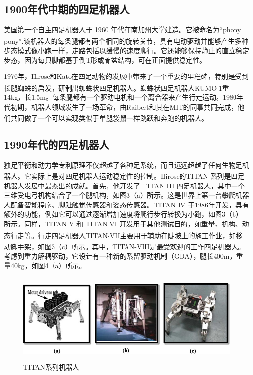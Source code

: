 \documentclass[12pt,a4paper]{ctexart}
\newcommand{\supercite}[1]{\textsuperscript{\cite{#1}}}
\begin{document}
\subsection{1900年代中期的四足机器人}
美国第一个自主四足机器人于 1960 年代在南加州大学建造。它被命名为“phony pony”\supercite{7}.该机器人的每条腿都有两个相同的旋转关节，具有电动驱动并能够产生多种步态模式像小跑一样，走路包括以缓慢的速度爬行。它还能够保持静止的直立稳定步态，因为每只脚都基于倒T形或骨盆结构，可在正面提供稳定性。

1976年，Hirose和Kato在四足动物的发展中带来了一个重要的里程碑，特别是受到长腿蜘蛛的启发，研制出蜘蛛状四足机器人\supercite{8}。蜘蛛状四足机器人KUMO-1重14kg，长1.5m。每条腿都有一个驱动电机和一个离合器来产生行走运动。1980年代初期，机器人领域发生了一场革命，由Raibert和其在MIT的同事共同完成，他们共同做了一个可以实现类似于单腿袋鼠一样跳跃和奔跑的机器人\supercite{9}。
\subsection{1990年代的四足机器人}
独足平衡和动力学专利原理不仅超越了各种足系统，而且远远超越了任何生物足机器人。它实际上是对四足机器人运动稳定性的控制。Hirose的TITAN 系列\supercite{10}是四足机器人发展中最杰出的成就。首先，他开发了 TITAN-III 四足机器人，其中一个三维受电弓机构结合了一个腿机构，如图3（a）所示。这是世界上第一台攀爬机器人配备智能程序、脚趾触觉传感器和姿态传感器。TITAN-IV 于1986年开发，具有额外的功能，例如它可以通过逐渐增加速度将爬行步行转换为小跑，如图3（b）所示。同样，TITAN-V 和 TITAN-VI 开发用于其他测试目的，如重量、机构、动态行走等。行走四足机器人TITAN-VII\supercite{11}主要用于辅助在陡坡上的施工作业，如移动脚手架，如图3（c）所示。其中，TITAN-VIII\supercite{12}是最受欢迎的工作四足机器人。考虑到重力解耦驱动，它设计有一种新的系留驱动机制（GDA），腿长400m，重量40kg，如图4（a）所示。
\begin{figure}[H]
	\centering
	\includegraphics[height=4.5cm]{IMG_03.jpg}
	\caption{TITAN系列机器人}
\end{figure}
\end{document}
